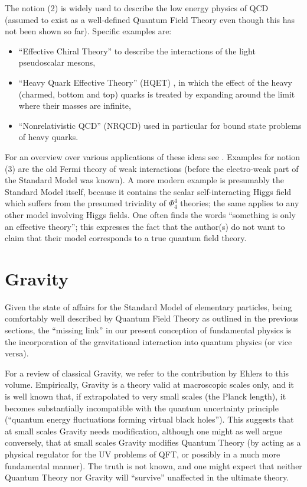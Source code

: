 \documentclass[multphys,vecphys]{svmult}
\begin{document}
The notion (2) is widely used to describe the low energy physics of
QCD (assumed to exist as a well-defined Quantum Field
Theory even though this has not been shown so far). Specific examples are: 
\begin{itemize}
\item
``Effective Chiral Theory'' \cite{Leu} to describe the interactions of 
the light pseudoscalar mesons,
\item
``Heavy Quark Effective Theory'' (HQET) \cite{Ei}, in which the effect 
of the heavy (charmed, bottom and top) quarks is treated by expanding 
around the limit where their masses are infinite, 
\item 
``Nonrelativistic QCD'' (NRQCD) \cite{Cas,Bod} used in particular 
for bound state problems of heavy quarks.  
\end{itemize}
For an overview over various applications of these ideas see \cite{Pi}.
\vskip5mm
Examples for notion (3) are the old Fermi theory of weak interactions (before the electro-weak part of the
Standard Model was known). A more modern example is presumably the
Standard Model itself, because it contains the scalar self-interacting
Higgs field which suffers from the presumed
triviality of  $\Phi^4_4$ theories; the same applies to any other
model involving Higgs fields. One often finds the words ``something  
is only an effective theory''; this expresses
the fact that the author(s) do not want to claim that their model
corresponds to a true quantum field theory.


\section{Gravity}\label{gravity}

Given the state of affairs for the Standard Model of elementary
particles, being comfortably well described by Quantum Field Theory as 
outlined in the previous sections, the ``missing link'' in our present
conception of fundamental physics is the incorporation of the
gravitational interaction into quantum physics
(or vice versa).  

For a review of classical Gravity, we refer to the contribution by Ehlers
to this volume. Empirically, Gravity is a theory valid at macroscopic
scales only, and it is well known that, if extrapolated to very small
scales (the Planck length), it becomes
substantially incompatible with the quantum
uncertainty principle (``quantum energy
fluctuations forming virtual black holes''). This
suggests that at small scales Gravity needs modification, although one
might as well argue conversely, that at small scales Gravity modifies
Quantum Theory (by acting as a physical regulator for the
UV problems of QFT, or possibly in a
much more fundamental manner). The truth is not known, and one might
expect that neither Quantum Theory nor Gravity will ``survive''
unaffected in the ultimate theory.  
\end{document}
